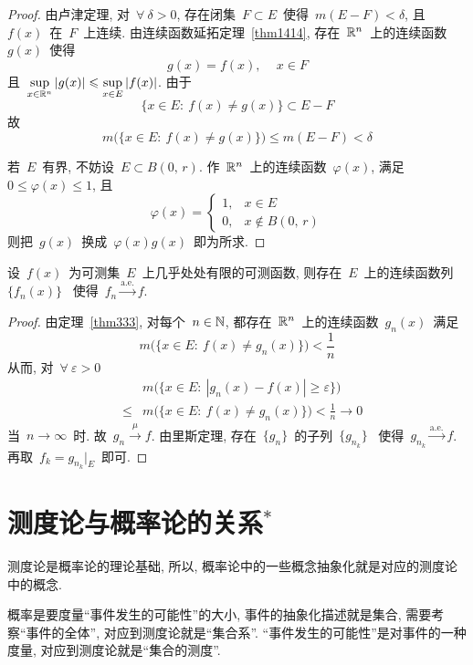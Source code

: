 \begin{proof}
由卢津定理, 对~$\forall~\delta > 0$, 存在闭集~$F \subset E$~使得~$m(E - F) < \delta$, 且~$f(x)$~在~$F$~上连续. 由连续函数延拓定理~\ref{thm1414}, 存在~$\mathbb{R}^n$~上的连续函数~$g(x)$~使得
\[
g(x) = f(x), \, \quad x \in F
\]
且~$\sup\limits_{x \in \mathbb{R}^n} |g(x)| \leqslant \sup\limits_{x \in E} |f(x)|$.
由于
\[
\{x \in E: \: f(x) \neq g(x)\} \subset E - F
\]
故
\[
m\big(\{x \in E: \: f(x) \neq g(x)\} \big) \leqslant m(E - F) < \delta
\]

若~$E$~有界, 不妨设~$E \subset B(0,\,r)$. 作~$\mathbb{R}^n$~上的连续函数~$\varphi(x)$, 满足~$0 \leqslant \varphi(x) \leqslant 1$, 且
\[
\varphi(x) = \left\{\!\!
\begin{array}{ll}
1, & x \in E \\[0.1cm]
0, & x \notin B(0,\,r)
\end{array}
\right.
\]
则把~$g(x)$~换成~$\varphi(x)g(x)$~即为所求.
\end{proof}

\begin{theorem}
设~$f(x)$~为可测集~$E$~上几乎处处有限的可测函数, 则存在~$E$~上的连续函数列~$\{f_n(x)\}$~
使得~$f_n \xrightarrow{\mathrm{a.e.}} f$.
\end{theorem}

\begin{proof}
由定理~\ref{thm333}, 对每个~$n \in \mathbb{N}$, 都存在~$\mathbb{R}^n$~上的连续函数~$g_n(x)$~满足
\[
m\big(\{x \in E: \: f(x) \neq g_n(x)\} \big) < \frac{1}{n}
\]
从而, 对~$\forall~\varepsilon > 0$
\begin{eqnarray*}
&& m\big( \{x \in E: \: |g_n(x) - f(x)| \geqslant \varepsilon \} \big) \\
&\leqslant& m\big(\{x \in E: \: f(x) \neq g_n(x)\} \big) < \frac{1}{n} \longrightarrow 0
\end{eqnarray*}
当~$n \to \infty$~时. 故~$g_n \xrightarrow{~\mu~} f$. 由里斯定理, 存在~$\{g_n\}$~的子列~$\{g_{n_k}\}$~
使得~$g_{n_k} \xrightarrow{\mathrm{a.e.}} f$. 再取~$f_k = g_{n_k}|_E$~即可.
\end{proof}

\section{测度论与概率论的关系$^\ast$}

测度论是概率论的理论基础, 所以, 概率论中的一些概念抽象化就是对应的测度论中的概念. 

概率是要度量``事件发生的可能性''的大小, 事件的抽象化描述就是集合, 需要考察``事件的全体'', 对应到测度论就是``集合系''. ``事件发生的可能性''是对事件的一种度量, 对应到测度论就是``集合的测度''. 

